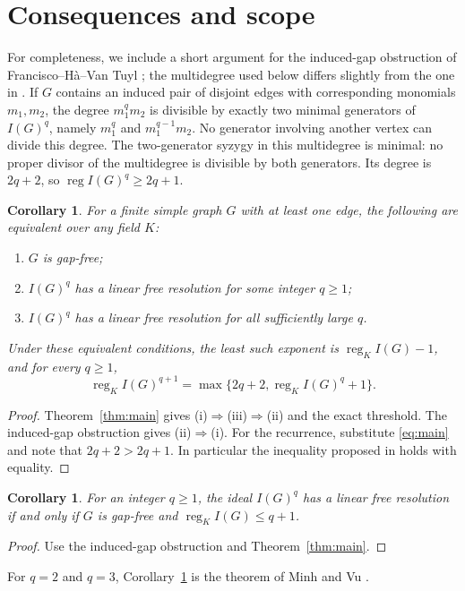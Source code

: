 \documentclass[11pt,a4paper]{article}
\newtheorem{corollary}[theorem]{Corollary}
\theoremstyle{definition}
\newcommand{\reg}{\operatorname{reg}}
\begin{document}
\section{Consequences and scope}\label{sec:consequences}
For completeness, we include a short argument for the induced-gap obstruction of Francisco--H\`a--Van Tuyl \cite[Proposition 1.8]{NP}; the multidegree used below differs slightly from the one in \cite{NP}. If $G$ contains an induced pair of disjoint edges with corresponding monomials $m_1,m_2$, the degree $m_1^qm_2$ is divisible by exactly two minimal generators of $I(G)^q$, namely $m_1^q$ and $m_1^{q-1}m_2$. No generator involving another vertex can divide this degree. The two-generator syzygy in this multidegree is minimal: no proper divisor of the multidegree is divisible by both generators. Its degree is $2q+2$, so $\reg I(G)^q\geq2q+1$.

\begin{corollary}\label{cor:np}
For a finite simple graph $G$ with at least one edge, the following are equivalent over any field $K$:
\begin{enumerate}[label=\textup{(\roman*)}]
 \item $G$ is gap-free;
 \item $I(G)^q$ has a linear free resolution for some integer $q\geq1$;
 \item $I(G)^q$ has a linear free resolution for all sufficiently large $q$.
\end{enumerate}
Under these equivalent conditions, the least such exponent is $\reg_K I(G)-1$, and for every $q\geq1$,
\[
 \reg_K I(G)^{q+1}=\max\{2q+2,\reg_K I(G)^q+1\}.
\]
\end{corollary}
\begin{proof}
Theorem~\ref{thm:main} gives (i)$\Rightarrow$(iii)$\Rightarrow$(ii) and the exact threshold. The induced-gap obstruction gives (ii)$\Rightarrow$(i). For the recurrence, substitute \eqref{eq:main} and note that $2q+2>2q+1$. In particular the inequality proposed in \cite[Open Problem 1.11(2)]{NP} holds with equality.
\end{proof}
\begin{corollary}\label{cor:linear-power}
For an integer $q\geq1$, the ideal $I(G)^q$ has a linear free resolution if and only if $G$ is gap-free and $\reg_K I(G)\leq q+1$.
\end{corollary}
\begin{proof}
Use the induced-gap obstruction and Theorem~\ref{thm:main}.
\end{proof}
For $q=2$ and $q=3$, Corollary~\ref{cor:linear-power} is the theorem of Minh and Vu \cite{MV}.
\end{document}
